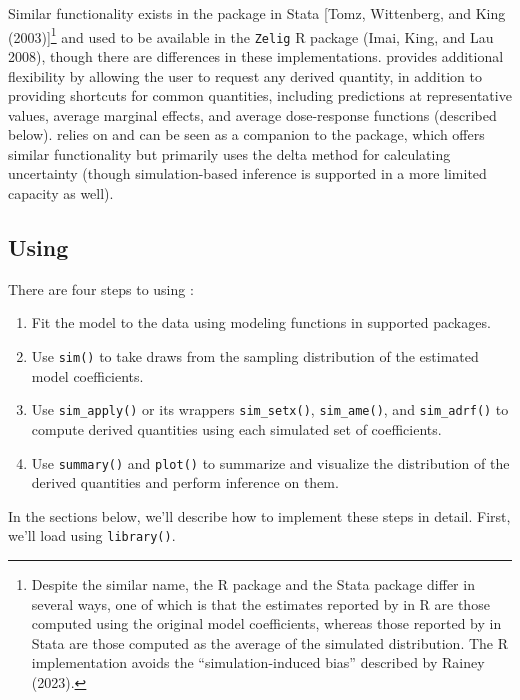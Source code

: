 Similar functionality exists in the  package in Stata {[}Tomz, Wittenberg, and King (2003){]}\footnote{Despite the similar name, the R package  and the Stata package  differ in several ways, one of which is that the estimates reported by  in R are those computed using the original model coefficients, whereas those reported by  in Stata are those computed as the average of the simulated distribution. The R implementation avoids the ``simulation-induced bias'' described by Rainey (2023).} and used to be available in the \texttt{Zelig} R package (Imai, King, and Lau 2008), though there are differences in these implementations.  provides additional flexibility by allowing the user to request any derived quantity, in addition to providing shortcuts for common quantities, including predictions at representative values, average marginal effects, and average dose-response functions (described below).  relies on and can be seen as a companion to the  package, which offers similar functionality but primarily uses the delta method for calculating uncertainty (though simulation-based inference is supported in a more limited capacity as well).

\hypertarget{using}{%
\subsection{\texorpdfstring{Using }{Using }}\label{using}}

There are four steps to using :

\begin{enumerate}
\def\labelenumi{\arabic{enumi}.}
\item
  Fit the model to the data using modeling functions in supported packages.
\item
  Use \texttt{sim()} to take draws from the sampling distribution of the estimated model coefficients.
\item
  Use \texttt{sim\_apply()} or its wrappers \texttt{sim\_setx()}, \texttt{sim\_ame()}, and \texttt{sim\_adrf()} to compute derived quantities using each simulated set of coefficients.
\item
  Use \texttt{summary()} and \texttt{plot()} to summarize and visualize the distribution of the derived quantities and perform inference on them.
\end{enumerate}

In the sections below, we'll describe how to implement these steps in detail. First, we'll load  using \texttt{library()}.


